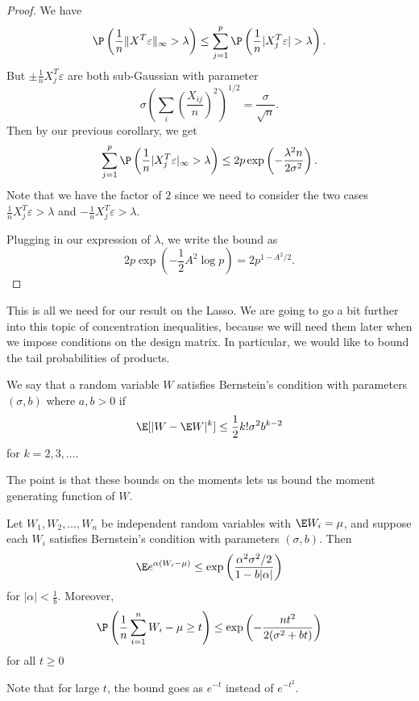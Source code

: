 \documentclass[a4paper]{article}
\begin{document}
\begin{proof}
  We have
  \[
    \P\left(\frac{1}{n}\|X^T \varepsilon\|_{\infty} > \lambda \right) \leq \sum_{j = 1}^p \P\left(\frac{1}{n} |X_j^T \varepsilon| > \lambda\right).
  \]
  But $\pm \frac{1}{n} X_j^T \varepsilon$ are both sub-Gaussian with parameter
  \[
    \sigma \left(\sum_i \left(\frac{X_{ij}}{n}\right)^2\right)^{1/2} = \frac{\sigma}{\sqrt{n}}.
  \]
  Then by our previous corollary, we get
  \[
    \sum_{j = 1}^p \P\left(\frac{1}{n} |X_j^T \varepsilon|_\infty > \lambda\right) \leq 2p \exp \left(- \frac{\lambda^2 n}{2\sigma^2}\right).
  \]
  Note that we have the factor of $2$ since we need to consider the two cases $\frac{1}{n} X_j^T \varepsilon > \lambda$ and $-\frac{1}{n} X_j^T \varepsilon > \lambda$.

  Plugging in our expression of $\lambda$, we write the bound as
  \[
    2p \exp\left(-\frac{1}{2} A^2 \log p\right) = 2p^{1 - A^2/2}.
  \]
\end{proof}
This is all we need for our result on the Lasso. We are going to go a bit further into this topic of concentration inequalities, because we will need them later when we impose conditions on the design matrix. In particular, we would like to bound the tail probabilities of products.

\begin{defi}
  We say that a random variable $W$ satisfies Bernstein's condition with parameters $(\sigma, b)$ where $a, b > 0$ if
  \[
    \E[|W - \E W|^k] \leq \frac{1}{2} k! \sigma^2 b^{k - 2}
  \]
  for $k = 2, 3, \ldots$.
\end{defi}
The point is that these bounds on the moments lets us bound the moment generating function of $W$.

\begin{prop}
  Let $W_1, W_2, \ldots, W_n$ be independent random variables with $\E W_i = \mu$, and suppose each $W_i$ satisfies Bernstein's condition with parameters $(\sigma, b)$. Then
  \[
    \E e^{\alpha(W_i - \mu)} \leq \exp \left(\frac{\alpha^2 \sigma^2/2}{1 - b|\alpha|}\right)
  \]
  for $|\alpha| < \frac{1}{b}$. Moreover,
  \[
    \P\left(\frac{1}{n} \sum_{i = 1}^n W_i - \mu \geq t\right) \leq \exp \left(-\frac{nt^2}{2 (\sigma^2 + bt)}\right)
  \]
  for all $t \geq 0$
\end{prop}
Note that for large $t$, the bound goes as $e^{-t}$ instead of $e^{-t^2}$.
\end{document}
